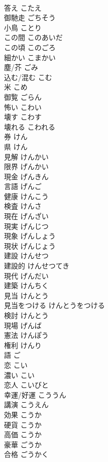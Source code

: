 \documentclass[8pt]{extreport}
\begin{document}
\begin{CJK}{UTF8}{min}
\\	答え	こたえ	
\\	御馳走	ごちそう	
\\	小鳥	ことり	
\\	この間	このあいだ	
\\	この頃	このごろ	
\\	細かい	こまかい	
\\	塵/芥	ごみ	
\\	込む/混む	こむ	
\\	米	こめ	
\\	御覧	ごらん	
\\	怖い	こわい	
\\	壊す	こわす	
\\	壊れる	こわれる	
\\	券	けん	
\\	県	けん	
\\	見解	けんかい	
\\	限界	げんかい	
\\	現金	げんきん	
\\	言語	げんご	
\\	健康	けんこう	
\\	検査	けんさ	
\\	現在	げんざい	
\\	現実	げんじつ	
\\	現象	げんしょう	
\\	現状	げんじょう	
\\	建設	けんせつ	
\\	建設的	けんせつてき	
\\	現代	げんだい	
\\	建築	けんちく	
\\	見当	けんとう	
\\	見当をつける	けんとうをつける	
\\	検討	けんとう	
\\	現場	げんば	
\\	憲法	けんぽう	
\\	権利	けんり	
\\	語	ご	
\\	恋	こい	
\\	濃い	こい	
\\	恋人	こいびと	
\\	幸運/好運	こううん	
\\	講演	こうえん	
\\	効果	こうか	
\\	硬貨	こうか	
\\	高価	こうか	
\\	豪華	ごうか	
\\	合格	ごうかく	

\end{CJK}
\end{document}
